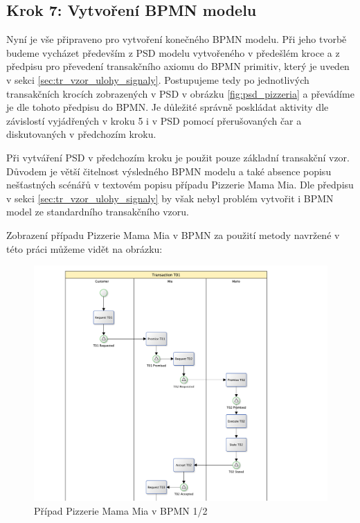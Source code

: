 \documentclass[]{article}
\begin{document}
\subsection{Krok 7: Vytvoření BPMN modelu}
Nyní je vše připraveno pro vytvoření konečného BPMN modelu. Při jeho tvorbě budeme vycházet především z PSD modelu vytvořeného v předešlém kroce a z předpisu pro převedení transakčního axiomu do BPMN primitiv, který je uveden v sekci \ref{sec:tr_vzor_ulohy_signaly}. Postupujeme tedy po jednotlivých transakčních krocích zobrazených v PSD v obrázku \ref{fig:psd_pizzeria} a převádíme je dle tohoto předpisu do BPMN. Je důležité správně poskládat aktivity dle závislostí vyjádřených v kroku 5 i v PSD pomocí přerušovaných čar a diskutovaných v předchozím kroku.

Při vytváření PSD v předchozím kroku je použit pouze základní transakční vzor. Důvodem je větší čitelnost výsledného BPMN modelu a také absence popisu nešťastných scénářů v textovém popisu případu Pizzerie Mama Mia. Dle předpisu v sekci \ref{sec:tr_vzor_ulohy_signaly} by však nebyl problém vytvořit i BPMN model ze standardního transakčního vzoru.

Zobrazení případu Pizzerie Mama Mia v BPMN za použití metody navržené v této práci můžeme vidět na obrázku:

\begin{center}
\begin{figure}[H]
\centerline{\includegraphics[width=1.28\textwidth,height=\textheight,keepaspectratio]{obrazky/pizzeria-bpmn-1}}
\caption{Případ Pizzerie Mama Mia v BPMN 1/2}
\label{fig:pizzeria_bpmn_1}
\end{figure}
\end{center}
\end{document}
